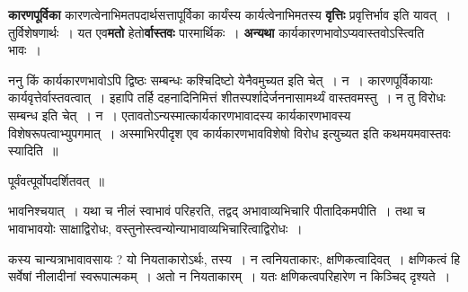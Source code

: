 \documentclass[article,12pt,a4paper]{memoir}
\begin{document}
	  \endgroup
	

	  \pstart \textbf{कारणपूर्विका} कारणत्वेनाभिमतपदार्थसत्तापूर्विका कार्यंस्य कार्यत्वेनाभिमतस्य \textbf{वृत्तिः} प्रवृत्तिर्भाव इति यावत् । तुर्विशेषणार्थः । यत एव\textbf{मतो} हेतो\textbf{र्वास्तवः} पारमार्थिकः । \textbf{अन्यथा} कार्यकारणभावोऽप्यवास्तवोऽस्त्विति भावः ।
	\pend
      

	  \pstart ननु किं कार्यकारणभावोऽपि द्विष्ठः सम्बन्धः कश्चिदिष्टो येनैवमुच्यत इति चेत् । न । कारणपूर्विकायाः कार्यवृत्तेर्वास्तवत्वात् । इहापि तर्हि दहनादिनिमित्तं शीतस्पर्शादेर्जननासामर्थ्यं वास्तवमस्तु । न तु विरोधः सम्बन्ध इति चेत् । न । एतावतोऽन्यस्मात्कार्यकारणभावादस्य कार्यकारणभावस्य विशेषरूपत्वाभ्युपगमात् । अस्माभिरपीदृश एव कार्यकारणभावविशेषो विरोध इत्युच्यत इति कथमयमवास्तवः स्यादिति ॥
	\pend
      

	  \pstart पूर्वंवत्पूर्वोपदर्शितवत् ॥
	\pend
	  \bigskip
	  \begingroup
	

	  \pstart भावनिश्चयात् । यथा च नीलं स्वाभावं परिहरति, तद्वद् अभावाव्यभिचारि पीतादिकमपीति । तथा च भावाभावयोः साक्षाद्विरोधः, वस्तुनोस्त्वन्योन्याभावाव्यभिचारित्वाद्विरोधः ।
	\pend
        

	  \pstart कस्य चान्यत्राभावावसायः ? यो नियताकारोऽर्थः, तस्य । न त्वनियताकारः, क्षणिकत्वादिवत् । क्षणिकत्वं हि सर्वेषां नीलादीनां स्वरूपात्मकम् । अतो न नियताकारम् । यतः क्षणिकत्वपरिहारेण न किञ्चिद् दृश्यते ।
	\pend
      
	  \endgroup
	
\end{document}
